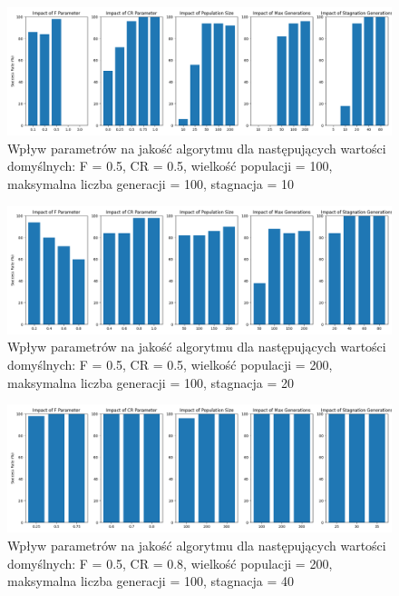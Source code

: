 \documentclass{article}
\begin{document}
\begin{figure}[H]
    \centering
    \includegraphics[width=\textwidth]{parameter_tuning_results_separate2.png}
    \caption{Wpływ parametrów na jakość algorytmu dla następujących wartości domyślnych: F = 0.5, CR = 0.5, wielkość populacji = 100, maksymalna liczba generacji = 100, stagnacja = 10}
    \label{fig:parameter_results2}
\end{figure}

\begin{figure}[H]
    \centering
    \includegraphics[width=\textwidth]{parameter_tuning_results_separate3.png}
    \caption{Wpływ parametrów na jakość algorytmu dla następujących wartości domyślnych: F = 0.5, CR = 0.5, wielkość populacji = 200, maksymalna liczba generacji = 100, stagnacja = 20}
    \label{fig:parameter_results3}
\end{figure}

\begin{figure}[H]
    \centering
    \includegraphics[width=\textwidth]{parameter_tuning_results_separate4.png}
    \caption{Wpływ parametrów na jakość algorytmu dla następujących wartości domyślnych: F = 0.5, CR = 0.8, wielkość populacji = 200, maksymalna liczba generacji = 100, stagnacja = 40}
    \label{fig:parameter_results4}
\end{figure}
\end{document}
